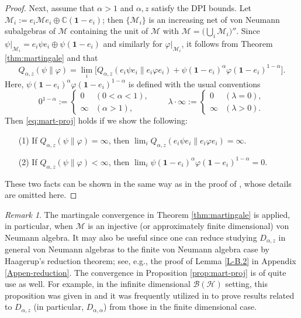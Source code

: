 \documentclass[12pt]{article}
\theoremstyle{definition}
\theoremstyle{remark}
\newtheorem{remark}[theorem]{Remark}
\numberwithin{equation}{section}
\def\Me{\mathcal M}
\def\ffi{\varphi}
\def\1{\mathbf{1}}
\def\bC{\mathbb{C}}
\begin{document}
\begin{proof}
Next, assume that $\alpha>1$ and $\alpha,z$ satisfy the DPI bounds. Let
$\Me_i:=e_i\Me e_i\oplus\bC(\1-e_i)$; then $\{\Me_i\}$ is an increasing net of von Neumann
subalgebras of $\Me$ containing the unit of $\Me$ with $\Me=\bigl(\bigcup_i\Me_i\bigr)''$. Since
$\psi|_{\Me_i}=e_i\psi e_i\oplus\psi(\1-e_i)$ and similarly for $\ffi|_{\Me_i}$, it follows from
Theorem \ref{thm:martingale} and \cite[Theorems 1(ii) and 2(ii)]{kato2023onrenyi} that
\[
Q_{\alpha,z}(\psi\|\ffi)
=\lim_i\bigl[Q_{\alpha,z}(e_i\psi e_i\|e_i\ffi e_i)
+\psi(\1-e_i)^\alpha\ffi(\1-e_i)^{1-\alpha}\bigr].
\]
Here, $\psi(\1-e_i)^\alpha\ffi(\1-e_i)^{1-\alpha}$ is defined with the usual conventions
\[
0^{1-\alpha}:=\begin{cases}0 & (0<\alpha<1), \\ \infty & (\alpha>1),\end{cases}\qquad
\lambda\cdot\infty:=\begin{cases}0 & (\lambda=0), \\ \infty & (\lambda>0).\end{cases}
\]
Then \eqref{eq:mart-proj} holds if we show the following:
\begin{itemize}
\item[(1)] If $Q_{\alpha,z}(\psi\|\ffi)=\infty$, then
$\lim_iQ_{\alpha,z}(e_i\psi e_i\|e_i\ffi e_i)=\infty$.
\item[(2)] If $Q_{\alpha,z}(\psi\|\ffi)<\infty$, then $\lim_i\psi(\1-e_i)^\alpha\ffi(\1-e_i)^{1-\alpha}=0$.
\end{itemize}
These two facts can be shown in the same way as in the proof of \cite[Theorem 4.5]{hiai2018quantum},
whose details are omitted here.
\end{proof}

\begin{remark}\label{remark:martingale}
The martingale convergence in Theorem \ref{thm:martingale} is applied, in particular, when $\Me$ is an
injective (or approximately finite dimensional) von Neumann algebra. It may also be useful since one can
reduce studying $D_{\alpha,z}$ in general von Neumann algebras to the finite von Neumann algebra
case by Haagerup's reduction theorem; see, e.g., the proof of Lemma \ref{L-B.2} in Appendix
\ref{Appen-reduction}. The convergence in Proposition \ref{prop:mart-proj} is of quite use as well.
For example, in the infinite dimensional $\mathcal{B}(\mathcal{H})$ setting, this proposition was given in
\cite[Proposition 3.40]{mosonyi2023thestrong} and it was frequently utilized in \cite{mosonyi2023thestrong}
to prove results related to $D_{\alpha,z}$ (in particular, $D_{\alpha,\alpha}$) from those in the finite
dimensional case.
\end{remark}
\end{document}
